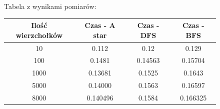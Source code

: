 \documentclass[a4paper,11pt]{report}
\begin{document}
\begin{figure}
  \begin{center}
  Tabela z wynikami pomiarów:\\
  \begin{tabular}{|c|c|c|c|}
  \hline 
  Ilość wierzchołków & Czas - A star & Czas - DFS & Czas - BFS\\
  \hline
  10 & 0.112 & 0.12 & 0.129\\
  \hline
  100 & 0.1481 & 0.14563 & 0.15704\\
  \hline
  1000	&	0.13681 & 0.1525 & 0.1643\\
  \hline
  5000	&	0.14000 & 0.1563 & 0.16597\\
  \hline
  8000 &	0.140496 & 0.1584 & 0.166325\\
  \hline
\end{tabular}
\end{center}
\end{figure}
\end{document}

